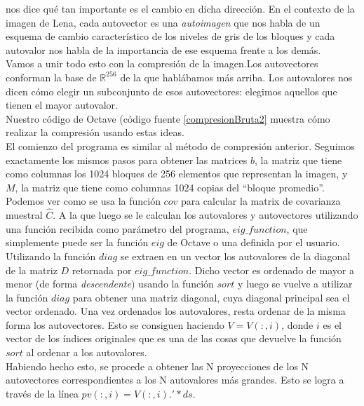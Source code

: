 \documentclass[twocolumn,a4paper,10pt]{article}
\begin{document}
 nos dice qu\'e tan importante es el cambio en dicha direcci\'on. En el contexto de la imagen de Lena, cada autovector es una \textit{autoimagen}
que nos habla de un esquema de cambio caracter\'istico de los niveles de gris de los bloques y cada autovalor nos habla de la importancia de ese esquema frente 
a los dem\'as. \\

Vamos a unir todo esto con la compresi\'on de la imagen.Los autovectores conforman la base de $\mathbb{R}^{256}$ de la que habl\'abamos m\'as arriba. 
Los autovalores nos dicen c\'omo elegir un subconjunto de esos autovectores: elegimos aquellos que tienen el mayor autovalor. \\

Nuestro c\'odigo de Octave (c\'odigo fuente \ref{compresionBruta2} muestra c\'omo realizar la compresi\'on usando estas ideas. \\

El comienzo del programa es similar al m\'etodo de compresi\'on anterior. Seguimos exactamente los mismos pasos para obtener las matrices $b$, la matriz que tiene como 
columnas los 1024 bloques de 256 elementos que representan la imagen, y $M$, la matriz que tiene como columnas 1024 copias del ``bloque promedio''.\\ 

Podemos ver como se usa la función $cov$ para calcular la matrix de covarianza muestral $\widehat{C}$. A la que luego se le calculan los autovalores y autovectores
utilizando una funci\'on recibida como par\'ametro del programa, $eig\_function$, que simplemente puede ser la funci\'on $eig$ de Octave o una definida por el usuario.
Utilizando la función $diag$ se extraen en un vector los autovalores de la diagonal de la matriz $D$ retornada por $eig\_function$. Dicho vector es ordenado de 
mayor a menor (de forma \textit{descendente}) usando la funci\'on $sort$ y luego se vuelve a utilizar la funci\'on $diag$ para obtener una matriz diagonal, cuya 
diagonal principal sea el vector ordenado. Una vez ordenados los autovalores, resta ordenar de la misma forma los autovectores. Esto se consiguen haciendo $V = V(:,i)$,
donde $i$ es el vector de los \'indices originales que es una de las cosas que devuelve la funci\'on $sort$ al ordenar a los autovalores.\\

Habiendo hecho esto, se procede a obtener las N proyecciones de los N autovectores correspondientes a los N autovalores más grandes. Esto se logra a través de la 
l\'inea $pv(:,i) = V(:,i).' * ds$. \\
\end{document}
